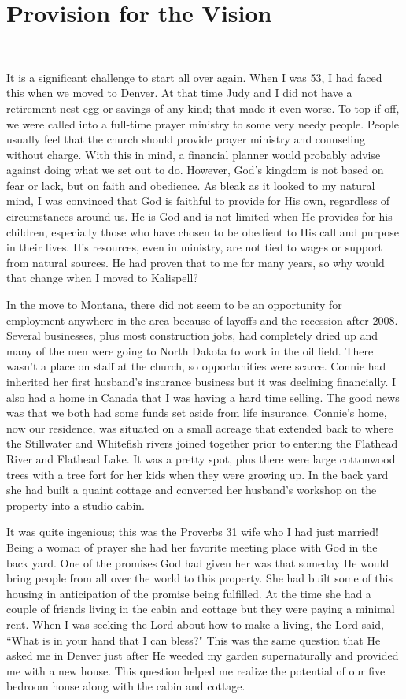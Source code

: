 \documentclass[oneside]{book}
\begin{document}
\section{Provision for the Vision}
\

It is a significant challenge to start all over again. When I was 53, I had faced this when we moved to Denver. At that time Judy and I did not have a retirement nest egg or savings of any kind; that made it even worse. To top if off, we were called into a full-time prayer ministry to some very needy people. People usually feel that the church should provide prayer ministry and counseling without charge. With this in mind, a financial planner would probably advise against doing what we set out to do. However, God's kingdom is not based on fear or lack, but on faith and obedience. As bleak as it looked to my natural mind, I was convinced that God is faithful to provide for His own, regardless of circumstances around us. He is God and is not limited when He provides for his children, especially those who have chosen to be obedient to His call and purpose in their lives. His resources, even in ministry, are not tied to wages or support from natural sources. He had proven that to me for many years, so why would that change when I moved to Kalispell?

In the move to Montana, there did not seem to be an opportunity for employment anywhere in the area because of layoffs and the recession after 2008. Several businesses, plus most construction jobs, had completely dried up and many of the men were going to North Dakota to work in the oil field. There wasn't a place on staff at the church, so opportunities were scarce. Connie had inherited her first husband's insurance business but it was declining financially. I also had a home in Canada that I was having a hard time selling. The good news was that we both had some funds set aside from life insurance. Connie's home, now our residence, was situated on a small acreage that extended back to where the Stillwater and Whitefish rivers joined together prior to entering the Flathead River and Flathead Lake. It was a pretty spot, plus there were large cottonwood trees with a tree fort for her kids when they were growing up. In the back yard she had built a quaint cottage and converted her husband's workshop on the property into a studio cabin. 

It was quite ingenious; this was the Proverbs 31 wife who I had just married! Being a woman of prayer she had her favorite meeting place with God in the back yard. One of the promises God had given her was that someday He would bring people from all over the world to this property. She had built some of this housing in anticipation of the promise being fulfilled. At the time she had a couple of friends living in the cabin and cottage but they were paying a minimal rent. When I was seeking the Lord about how to make a living, the Lord said, ``What is in your hand that I can bless?" This was the same question that He asked me in Denver just after He weeded my garden supernaturally and provided me with a new house. This question helped me realize the potential of our five bedroom house along with the cabin and cottage.
 
\end{document}
